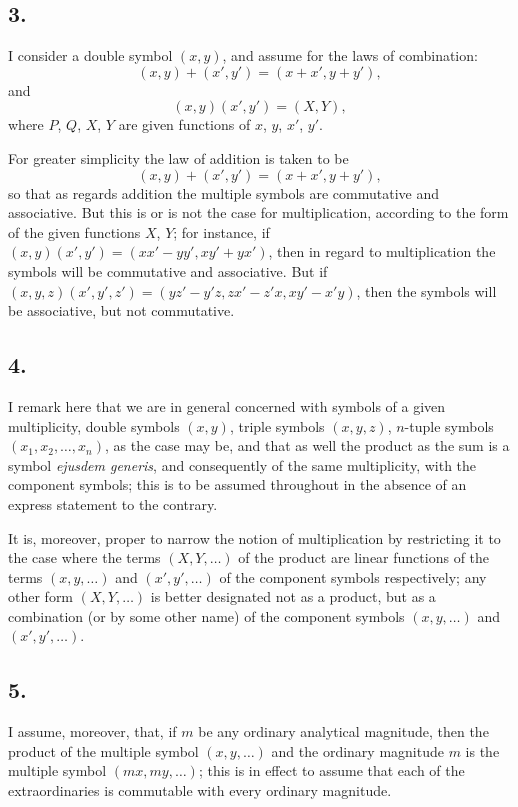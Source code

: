\documentclass[11pt,a4paper]{article}
\theoremstyle{definition}
\begin{document}
\subsection*{3.}

I consider a double symbol $(x, y)$, and assume for the laws of combination:
\[
(x, y) + (x', y') = (x + x', y + y'),
\]
and
\[
(x, y)(x', y') = (X, Y),
\]
where $P$, $Q$, $X$, $Y$ are given functions of $x$, $y$, $x'$, $y'$.

For greater simplicity the law of addition is taken to be
\[
(x, y) + (x', y') = (x + x', y + y'),
\]
so that as regards addition the multiple symbols are commutative and associative. But this is or is not the case for multiplication, according to the form of the given functions $X$, $Y$; for instance, if $(x, y)(x', y') = (xx' - yy', xy' + yx')$, then in regard to multiplication the symbols will be commutative and associative. But if $(x, y, z)(x', y', z') = (yz' - y'z, zx' - z'x, xy' - x'y)$, then the symbols will be associative, but not commutative.

\subsection*{4.}

I remark here that we are in general concerned with symbols of a given multiplicity, double symbols $(x, y)$, triple symbols $(x, y, z)$, $n$-tuple symbols $(x_1, x_2, \ldots, x_n)$, as the case may be, and that as well the product as the sum is a symbol \textit{ejusdem generis}, and consequently of the same multiplicity, with the component symbols; this is to be assumed throughout in the absence of an express statement to the contrary.

It is, moreover, proper to narrow the notion of multiplication by restricting it to the case where the terms $(X, Y, \ldots)$ of the product are linear functions of the terms $(x, y, \ldots)$ and $(x', y', \ldots)$ of the component symbols respectively; any other form $(X, Y, \ldots)$ is better designated not as a product, but as a combination (or by some other name) of the component symbols $(x, y, \ldots)$ and $(x', y', \ldots)$.

\subsection*{5.}

I assume, moreover, that, if $m$ be any ordinary analytical magnitude, then the product of the multiple symbol $(x, y, \ldots)$ and the ordinary magnitude $m$ is the multiple symbol $(mx, my, \ldots)$; this is in effect to assume that each of the extraordinaries is commutable with every ordinary magnitude.
\end{document}
